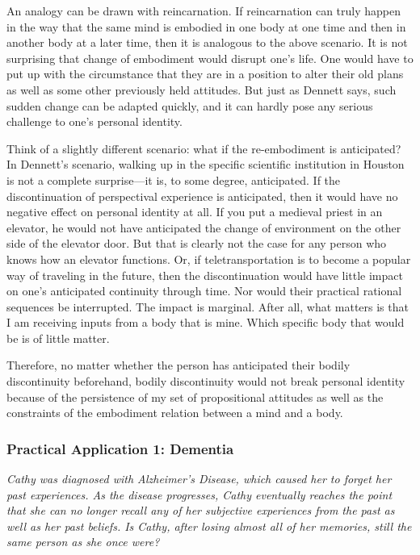 An analogy can be drawn with reincarnation. If reincarnation can truly
happen in the way that the same mind is embodied in one body at one time
and then in another body at a later time, then it is analogous to the
above scenario. It is not surprising that change of embodiment would
disrupt one's life. One would have to put up with the circumstance that
they are in a position to alter their old plans as well as some other
previously held attitudes. But just as Dennett says, such sudden change
can be adapted quickly, and it can hardly pose any serious challenge to
one's personal identity.

Think of a slightly different scenario: what if the re-embodiment is
anticipated? In Dennett's scenario, walking up in the specific
scientific institution in Houston is not a complete surprise---it is,
to some degree, anticipated. If the discontinuation of perspectival
experience is anticipated, then it would have no negative effect on
personal identity at all. If you put a medieval priest in an elevator,
he would not have anticipated the change of environment on the other
side of the elevator door. But that is clearly not the case for any
person who knows how an elevator functions. Or, if teletransportation is
to become a popular way of traveling in the future, then the
discontinuation would have little impact on one's anticipated continuity
through time. Nor would their practical rational sequences be
interrupted. The impact is marginal. After all, what matters is that I
am receiving inputs from a body that is mine. Which specific body that
would be is of little matter.

Therefore, no matter whether the person has anticipated their bodily
discontinuity beforehand, bodily discontinuity would not break personal
identity because of the persistence of my set of propositional attitudes
as well as the constraints of the embodiment relation between a mind and
a body.


\subsubsection*{Practical Application 1: Dementia}

\emph{Cathy was diagnosed with Alzheimer's Disease, which caused her to
forget her past experiences. As the disease progresses, Cathy eventually
reaches the point that she can no longer recall any of her subjective
experiences from the past as well as her past beliefs. Is Cathy, after
losing almost all of her memories, still the same person as she once
were?}
\vspace{1em}

